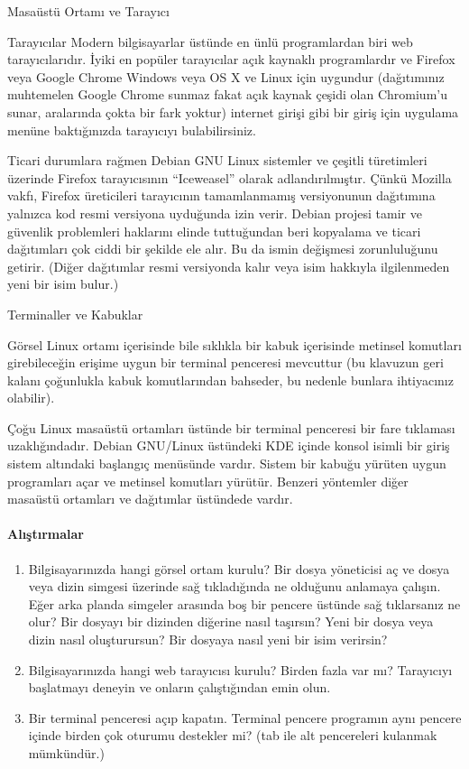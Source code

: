 \begin{section}{Masaüstü Ortamı ve Tarayıcı}
\begin{subsection}{Tarayıcılar}
Modern bilgisayarlar üstünde en ünlü programlardan biri web tarayıcılarıdır. İyiki en popüler tarayıcılar açık kaynaklı programlardır ve Firefox veya Google Chrome Windows veya OS X ve Linux için uygundur (dağıtımınız muhtemelen Google Chrome sunmaz fakat açık kaynak çeşidi olan Chromium’u sunar, aralarında çokta bir fark yoktur) internet girişi gibi bir giriş için uygulama menüne baktığınızda tarayıcıyı bulabilirsiniz.

Ticari durumlara rağmen Debian GNU Linux sistemler ve çeşitli türetimleri üzerinde Firefox tarayıcısının  “Iceweasel” olarak adlandırılmıştır. Çünkü Mozilla vakfı, Firefox üreticileri tarayıcının tamamlanmamış versiyonunun dağıtımına yalnızca kod resmi versiyona  uyduğunda izin verir. Debian projesi tamir ve güvenlik problemleri haklarını elinde tuttuğundan beri kopyalama ve ticari dağıtımları çok ciddi bir şekilde ele alır. Bu da ismin değişmesi zorunluluğunu getirir. (Diğer dağıtımlar resmi versiyonda kalır veya isim hakkıyla ilgilenmeden yeni bir isim bulur.) 
\end{subsection}
\begin{subsection}{Terminaller ve Kabuklar}
\label{sec:bolum323}

Görsel Linux ortamı içerisinde bile sıklıkla bir kabuk içerisinde metinsel komutları girebileceğin erişime uygun bir terminal penceresi mevcuttur (bu klavuzun geri kalanı çoğunlukla kabuk komutlarından bahseder, bu nedenle bunlara ihtiyacınız olabilir).

Çoğu Linux masaüstü ortamları üstünde bir terminal penceresi bir fare tıklaması uzaklığındadır. Debian GNU/Linux üstündeki KDE içinde konsol isimli bir giriş sistem altındaki başlangıç menüsünde vardır. Sistem bir kabuğu yürüten uygun programları açar ve metinsel komutları yürütür. Benzeri yöntemler diğer masaüstü ortamları ve dağıtımlar üstündede vardır.
\end{subsection}

\paragraph{{\Huge{\PencilLeftDown}}Alıştırmalar}{
\begin{enumerate}
 \item Bilgisayarınızda hangi görsel ortam kurulu? Bir dosya yöneticisi aç ve dosya veya dizin simgesi üzerinde sağ tıkladığında ne olduğunu anlamaya çalışın. Eğer arka planda simgeler arasında boş bir pencere üstünde sağ tıklarsanız ne olur? Bir dosyayı bir dizinden diğerine nasıl taşırsın? Yeni bir dosya veya dizin nasıl oluşturursun? Bir dosyaya nasıl yeni bir isim verirsin?
 \item Bilgisayarınızda hangi web tarayıcısı kurulu? Birden fazla var mı? Tarayıcıyı başlatmayı deneyin ve onların çalıştığından emin olun.
 \item Bir terminal penceresi açıp kapatın. Terminal pencere programın aynı pencere içinde birden çok oturumu destekler mi? (tab ile alt pencereleri kulanmak mümkündür.)
\end{enumerate}}
\end{section}
